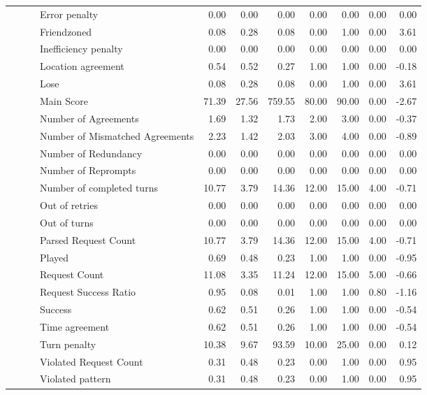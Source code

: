 \begin{tabular}{llllrrrrrrr}
 &  &  & Error penalty & 0.00 & 0.00 & 0.00 & 0.00 & 0.00 & 0.00 & 0.00 \\
 &  &  & Friendzoned & 0.08 & 0.28 & 0.08 & 0.00 & 1.00 & 0.00 & 3.61 \\
 &  &  & Inefficiency penalty & 0.00 & 0.00 & 0.00 & 0.00 & 0.00 & 0.00 & 0.00 \\
 &  &  & Location agreement & 0.54 & 0.52 & 0.27 & 1.00 & 1.00 & 0.00 & -0.18 \\
 &  &  & Lose & 0.08 & 0.28 & 0.08 & 0.00 & 1.00 & 0.00 & 3.61 \\
 &  &  & Main Score & 71.39 & 27.56 & 759.55 & 80.00 & 90.00 & 0.00 & -2.67 \\
 &  &  & Number of Agreements & 1.69 & 1.32 & 1.73 & 2.00 & 3.00 & 0.00 & -0.37 \\
 &  &  & Number of Mismatched Agreements & 2.23 & 1.42 & 2.03 & 3.00 & 4.00 & 0.00 & -0.89 \\
 &  &  & Number of Redundancy & 0.00 & 0.00 & 0.00 & 0.00 & 0.00 & 0.00 & 0.00 \\
 &  &  & Number of Reprompts & 0.00 & 0.00 & 0.00 & 0.00 & 0.00 & 0.00 & 0.00 \\
 &  &  & Number of completed turns & 10.77 & 3.79 & 14.36 & 12.00 & 15.00 & 4.00 & -0.71 \\
 &  &  & Out of retries & 0.00 & 0.00 & 0.00 & 0.00 & 0.00 & 0.00 & 0.00 \\
 &  &  & Out of turns & 0.00 & 0.00 & 0.00 & 0.00 & 0.00 & 0.00 & 0.00 \\
 &  &  & Parsed Request Count & 10.77 & 3.79 & 14.36 & 12.00 & 15.00 & 4.00 & -0.71 \\
 &  &  & Played & 0.69 & 0.48 & 0.23 & 1.00 & 1.00 & 0.00 & -0.95 \\
 &  &  & Request Count & 11.08 & 3.35 & 11.24 & 12.00 & 15.00 & 5.00 & -0.66 \\
 &  &  & Request Success Ratio & 0.95 & 0.08 & 0.01 & 1.00 & 1.00 & 0.80 & -1.16 \\
 &  &  & Success & 0.62 & 0.51 & 0.26 & 1.00 & 1.00 & 0.00 & -0.54 \\
 &  &  & Time agreement & 0.62 & 0.51 & 0.26 & 1.00 & 1.00 & 0.00 & -0.54 \\
 &  &  & Turn penalty & 10.38 & 9.67 & 93.59 & 10.00 & 25.00 & 0.00 & 0.12 \\
 &  &  & Violated Request Count & 0.31 & 0.48 & 0.23 & 0.00 & 1.00 & 0.00 & 0.95 \\
 &  &  & Violated pattern & 0.31 & 0.48 & 0.23 & 0.00 & 1.00 & 0.00 & 0.95 \\

\end{tabular}
